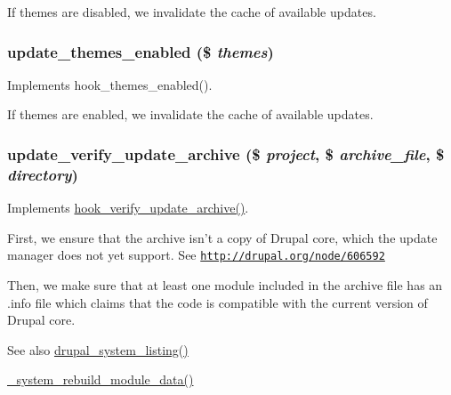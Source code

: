 If themes are disabled, we invalidate the cache of available updates. \hypertarget{update_8module_a66cb96d284e782a3207e4773749ad3e6}{
\subsubsection[{update\_\-themes\_\-enabled}]{\setlength{\rightskip}{0pt plus 5cm}update\_\-themes\_\-enabled (\$ {\em themes})}}
\label{update_8module_a66cb96d284e782a3207e4773749ad3e6}
Implements hook\_\-themes\_\-enabled().

If themes are enabled, we invalidate the cache of available updates. \hypertarget{update_8module_afd8be1dfd15eb83f64e1ce593a5f1756}{
\subsubsection[{update\_\-verify\_\-update\_\-archive}]{\setlength{\rightskip}{0pt plus 5cm}update\_\-verify\_\-update\_\-archive (\$ {\em project}, \/  \$ {\em archive\_\-file}, \/  \$ {\em directory})}}
\label{update_8module_afd8be1dfd15eb83f64e1ce593a5f1756}
Implements \hyperlink{group__update__manager__file_ga68a5dd6bec824909f46d9458991eaf42}{hook\_\-verify\_\-update\_\-archive()}.

First, we ensure that the archive isn't a copy of Drupal core, which the update manager does not yet support. See \href{http://drupal.org/node/606592}{\tt http://drupal.org/node/606592}

Then, we make sure that at least one module included in the archive file has an .info file which claims that the code is compatible with the current version of Drupal core.

\begin{DoxySeeAlso}{See also}
\hyperlink{common_8inc_a60d1237b23d4e84a59656003596add4b}{drupal\_\-system\_\-listing()} 

\hyperlink{system_8module_aec98f44cde3933b35e0cb066d387c54c}{\_\-system\_\-rebuild\_\-module\_\-data()} 
\end{DoxySeeAlso}
